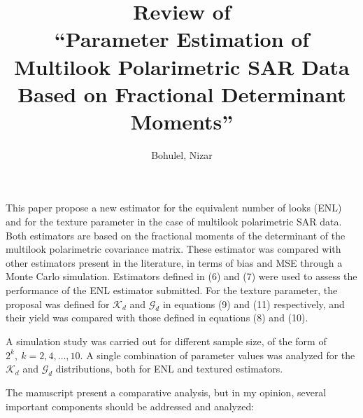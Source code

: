 \documentclass[journal,onecolumn,12pt]{IEEEtran}
\title{Review of\\
	``Parameter Estimation of Multilook Polarimetric SAR Data
	Based on Fractional Determinant Moments''}
\author{Bohulel, Nizar}
\begin{document}
	
\maketitle
{}
\setcounter{page}{1}
	
This paper propose a new estimator for the equivalent number of looks (ENL) and for the texture parameter in the case of multilook polarimetric SAR data. Both estimators are based on the fractional moments of the determinant of the multilook polarimetric covariance matrix. These estimator was compared with other estimators present in the literature, in terms of bias and MSE through a Monte Carlo simulation. 
Estimators defined in (6) and (7) were used to assess the performance of the ENL estimator submitted. For the texture parameter, the proposal was defined for $\mathcal{K}_d$ and $\mathcal{G}_d$ in equations (9) and (11) respectively, and their yield was compared with those defined in equations (8) and (10).


A simulation study was carried out for different sample size, of the form of $2^k, \ k=2, 4, \ldots,10$. A single combination of parameter values was analyzed for the $\mathcal{K}_d$ and $\mathcal{G}_d$ distributions, both for ENL and textured estimators.

The manuscript present a comparative analysis, but in my opinion, several important components should be addressed and analyzed:
\end{document}

